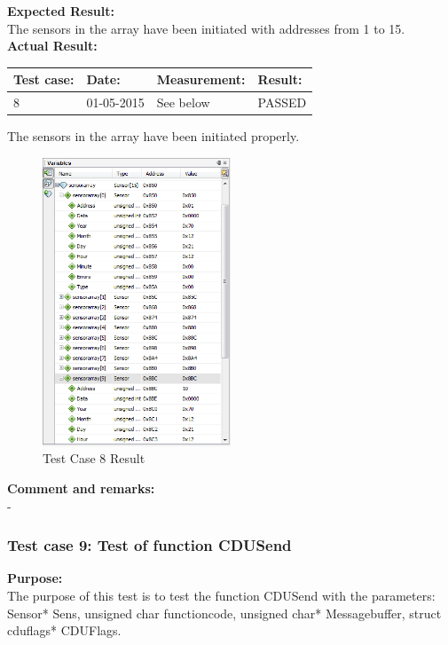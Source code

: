 \textbf{Expected Result:}\\
The sensors in the array have been initiated with addresses from 1 to 15.\\

\textbf{Actual Result:}\\
\begin{table}[H]
\centering
\begin{tabular}{|p{2cm}|p{2cm}|p{3cm}|p{2cm}|}\hline
\textbf{Test case:} & \textbf{Date:} & \textbf{Measurement:} & \textbf{Result:} \\ \hline
8 & 01-05-2015 & See below & PASSED \\ \hline
\end{tabular}
\end{table}
The sensors in the array have been initiated properly.\\
\begin{figure}[H]
\centering
\includegraphics[width=0.5\textwidth]{billeder/CDUtestcase8}
\caption{Test Case 8 Result}
\label{fig:cdutestcase8}
\end{figure}

\textbf{Comment and remarks:}\\
-\\

\subsubsection{Test case 9: Test of function CDUSend }
\textbf{Purpose:}\\
The purpose of this test is to test the function CDUSend with the parameters: Sensor* Sens, unsigned char functioncode, unsigned char* Messagebuffer, struct cduflags* CDUFlags.\\

